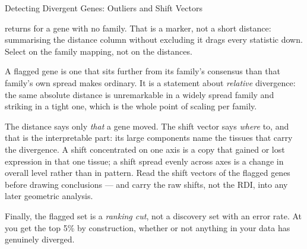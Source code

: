 \begin{recipe}[label=rec:outlier-detection]{Detecting Divergent Genes: Outliers and Shift Vectors}
\begin{pitfall}
   returns  for a gene with no family.
  That is a marker, not a short distance: summarising the distance column
  without excluding it drags every statistic down. Select on the family
  mapping, not on the distances.
\end{pitfall}

\begin{interpretation}
  A flagged gene is one that sits further from its family's consensus than that
  family's own spread makes ordinary. It is a statement about \emph{relative}
  divergence: the same absolute distance is unremarkable in a widely spread
  family and striking in a tight one, which is the whole point of scaling per
  family.

  The distance says only \emph{that} a gene moved. The shift vector says
  \emph{where} to, and that is the interpretable part: its large components
  name the tissues that carry the divergence. A shift concentrated on one axis
  is a copy that gained or lost expression in that one tissue; a shift spread
  evenly across axes is a change in overall level rather than in pattern. Read
  the shift vectors of the flagged genes before drawing conclusions --- and
  carry the raw shifts, not the RDI, into any later geometric analysis.

  Finally, the flagged set is a \emph{ranking cut}, not a discovery set with an
  error rate. At \mbox{} you get the top 5\% by construction,
  whether or not anything in your data has genuinely diverged.
\end{interpretation}

\begin{references}
\end{references}

\end{recipe}

